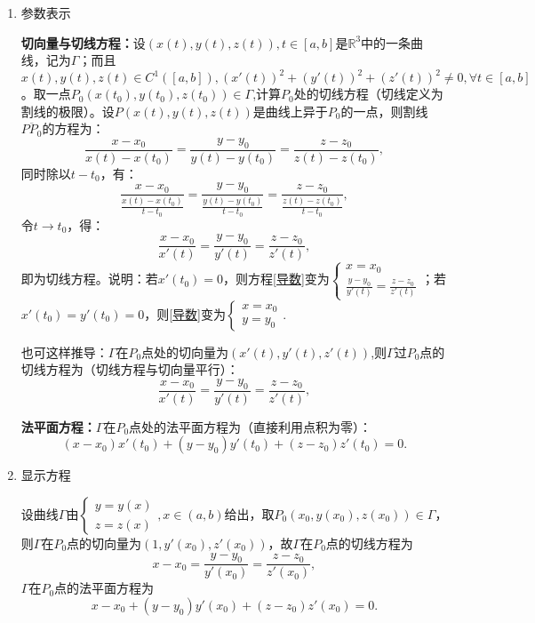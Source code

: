 \documentclass[UTF8]{ctexart}
\begin{document}
    \begin{enumerate}
        \item 参数表示
        
        \textbf{切向量与切线方程：}设$(x(t),y(t),z(t)),t\in[a,b]$是$\mathbb{R}^3$中的一条曲线，记为$\Gamma$；而且$x(t),y(t),z(t)\in C^1([a,b]),(x'(t))^2+(y'(t))^2  +(z'(t))^2\not=0,\forall t\in[a,b]$。取一点$P_0(x(t_0),y(t_0),z(t_0))\in\Gamma$,计算$P_0$处的切线方程（切线定义为割线的极限）。设$P(x(t),y(t),z(t))$是曲线上异于$P_0$的一点，则割线$\overline{PP_0}$的方程为：$$\frac{x-x_0}{x(t)-x(t_0)}=\frac{y-y_0}{y(t)-y(t_0)}=\frac{z-z_0}{z(t)-z(t_0)},$$
        同时除以$t-t_0$，有：
        $$\frac{x-x_0}{\frac{x(t)-x(t_0)}{t-t_0}}=\frac{y-y_0}{\frac{y(t)-y(t_0)}{t-t_0}}=\frac{z-z_0}{\frac{z(t)-z(t_0)}{t-t_0}},$$
        令$t\to t_0$，得：
        \begin{equation}
            \frac{x-x_0}{x'(t)}=\frac{y-y_0}{y'(t)}=\frac{z-z_0}{z'(t)},\label{导数}
        \end{equation}
        即为切线方程。说明：若$x'(t_0)=0$，则方程\eqref{导数}变为$\begin{cases}
            x=x_0\\
            \frac{y-y_0}{y'(t)}=\frac{z-z_0}{z'(t)}
        \end{cases}$；若$x'(t_0)=y'(t_0)=0$，则\eqref{导数}变为$\begin{cases}
            x=x_0\\
            y=y_0
        \end{cases}$.
        
        也可这样推导：$\Gamma$在$P_0$点处的切向量为$(x'(t),y'(t),z'(t))$,则$\Gamma$过$P_0$点的切线方程为（切线方程与切向量平行）：
        \begin{equation}
            \frac{x-x_0}{x'(t)}=\frac{y-y_0}{y'(t)}=\frac{z-z_0}{z'(t)},
        \end{equation}

        \textbf{法平面方程：}$\Gamma$在$P_0$点处的法平面方程为（直接利用点积为零）：
        \begin{equation}
            (x-x_0)x'(t_0)+(y-y_0)y'(t_0)+(z-z_0)z'(t_0)=0.
        \end{equation}

        \item 显示方程
        
        设曲线$\Gamma$由$\begin{cases}
            y=y(x)\\
            z=z(x)
        \end{cases},x\in(a,b)$给出，取$P_0(x_0,y(x_0),z(x_0))\in\Gamma$，则$\Gamma$在$P_0$点的切向量为$(1,y'(x_0),z'(x_0))$，故$\Gamma$在$P_0$点的切线方程为$$x-x_0=\frac{y-y_0}{y'(x_0)}=\frac{z-z_0}{z'(x_0)},$$$\Gamma$在$P_0$点的法平面方程为$$x-x_0+(y-y_0)y'(x_0)+(z-z_0)z'(x_0)=0.$$


\end{enumerate}
\end{document}
